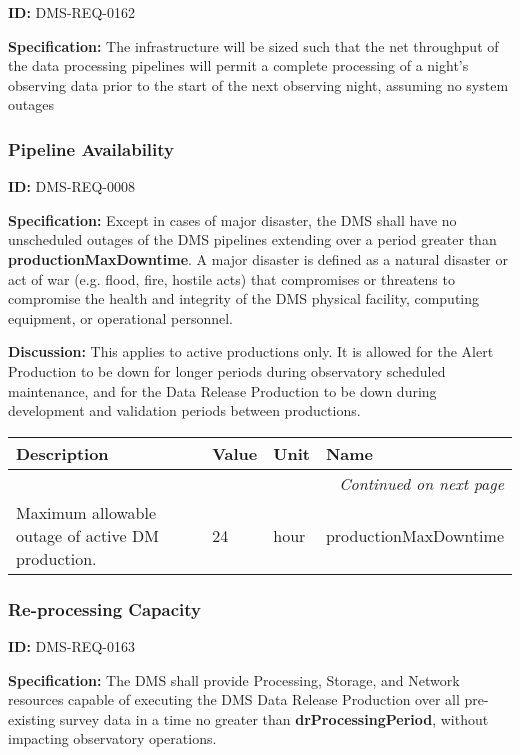 \documentclass[SE,toc,lsstdraft]{lsstdoc}
\makeatletter
\newcommand{\paramname}[1]{\hspace{0pt}#1}
\newcommand{\unitname}[1]{\hspace{0pt}#1}
\newenvironment{parameters}[0]{%
\setlength\LTleft{0pt}
\setlength\LTright{\fill}
\begin{small}
\begin{longtable}[]{|p{0.5\textwidth}|l|p{0.6in}|p{1.74in}@{}|}

\hline \textbf{Description} & \textbf{Value} & \textbf{Unit} & \textbf{Name} \\ \hline
\endhead

\hline \multicolumn{4}{r}{\emph{Continued on next page}} \\
\endfoot

\hline\hline
\endlastfoot
}{%
\hline
\end{longtable}
\end{small}
}
\makeatother
\begin{document}
\label{DMS-REQ-0162}
\textbf{ID:} DMS-REQ-0162

\textbf{Specification:} The infrastructure will be sized such that the net throughput of the data processing pipelines will permit a complete processing of a night’s observing data prior to the start of the next observing night, assuming no system outages






\subsubsection{Pipeline Availability}

\label{DMS-REQ-0008}
\textbf{ID:} DMS-REQ-0008

\textbf{Specification:} Except in cases of major disaster, the DMS shall have no unscheduled outages of the DMS pipelines extending over a period greater than \textbf{productionMaxDowntime}.  A major disaster is defined as a natural disaster or act of war (e.g. flood, fire, hostile acts) that compromises or threatens to compromise the health and integrity of the DMS physical facility, computing equipment, or operational personnel.

\textbf{Discussion:} This applies to active productions only. It is allowed for the Alert Production to be down for longer periods during observatory scheduled maintenance, and for the Data Release Production to be down during development and validation periods between productions.



\begin{parameters}
Maximum allowable outage of active DM production.
&
24
&
\unitname{%
hour
}
&
\paramname{%
productionMaxDowntime
} \\\hline
\end{parameters}




\subsubsection{Re-processing Capacity}

\label{DMS-REQ-0163}
\textbf{ID:} DMS-REQ-0163

\textbf{Specification:} The DMS shall provide Processing, Storage, and Network resources capable of executing the DMS Data Release Production over all pre-existing survey data in a time no greater than \textbf{drProcessingPeriod}, without impacting observatory operations.
\end{document}
